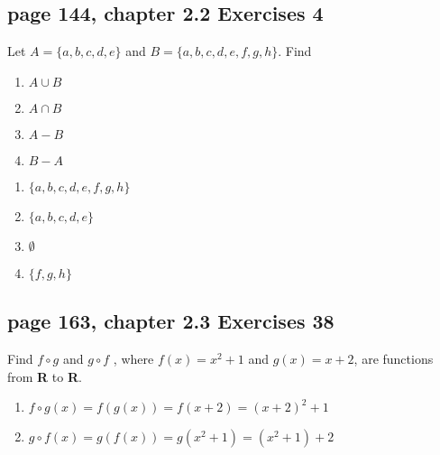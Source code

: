 \documentclass[sigconf]{acmart}
\begin{document}
\subsection{page 144, chapter 2.2 Exercises 4}
\begin{shaded}
    Let $A = \{a, b, c, d, e\}$ and $B = \{a, b, c, d, e, f, g, h\}$. Find
    \begin{enumerate}[label=(\alph*)]
    	\item $A \cup B$
    	\item $A \cap B$
    	\item $A - B$
    	\item $B - A$
    \end{enumerate}
\end{shaded}  
\begin{enumerate}[label=(\alph*)]
	\item $\{a, b, c, d, e, f, g, h\}$
	\item \underline{$\{a,b,c,d,e\}$}
	\item \underline{$\emptyset$}
	\item \underline{$\{f,g,h\}$}
\end{enumerate}

\subsection{page 163, chapter 2.3 Exercises 38}
\begin{shaded}
    Find $f \circ g$ and $g \circ f$ , where $f(x) = x^2 + 1$ and $g(x) = x + 2$, are functions from \textbf{R} to \textbf{R}.
\end{shaded}  

\begin{enumerate}[label=(\alph*)]
\item \underline{$f\circ g (x)=f(g(x))=f(x+2)=(x+2)^2+1$}
\item \underline{$g\circ f (x)=g(f(x))=g(x^2+1)=(x^2+1)+2$}
\end{enumerate}
\end{document}
